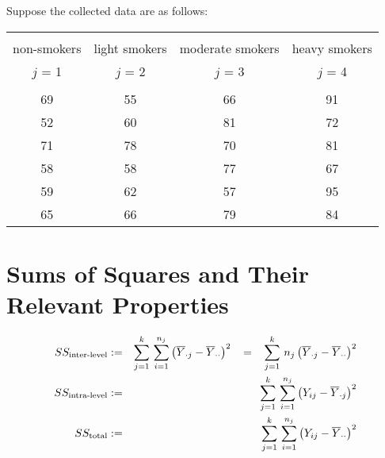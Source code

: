 \documentclass{article}
\begin{document}

\noindent
Suppose the collected data are as follows:
\begin{center}
\begin{tabular}{|c|c|c|c|}
\hline
&&&\\
non-smokers & light smokers & moderate smokers & heavy smokers \\
$j$ = 1&$j$ = 2&$j$ = 3&$j$ = 4\\
&&&\\
\hline
69 & 55 & 66 & 91 \\
52 & 60 & 81 & 72 \\
71 & 78 & 70 & 81 \\
58 & 58 & 77 & 67 \\
59 & 62 & 57 & 95 \\
65 & 66 & 79 & 84 \\
\hline
\end{tabular}
\end{center}


\section{Sums of Squares and Their Relevant Properties}
\setcounter{theorem}{0}

\begin{eqnarray*}
SS_{\textnormal{inter-level}}
& := & \sum^{k}_{j=1}\,\sum^{n_{j}}_{i=1}\left(\overline{Y}_{\cdot j} - \overline{Y}_{\cdot\cdot}\right)^{2}
\;\;\; = \;\;\; \sum^{k}_{j=1}\,n_{j}\left(\overline{Y}_{\cdot j} - \overline{Y}_{\cdot\cdot}\right)^{2} \\
SS_{\textnormal{intra-level}}
& := & \sum^{k}_{j=1}\,\sum^{n_{j}}_{i=1}\left(Y_{ij} - \overline{Y}_{\cdot j}\right)^{2} \\
SS_{\textnormal{total}}
& := & \sum^{k}_{j=1}\,\sum^{n_{j}}_{i=1}\left(Y_{ij} - \overline{Y}_{\cdot\cdot}\right)^{2} \\
\end{eqnarray*}
\end{document}
